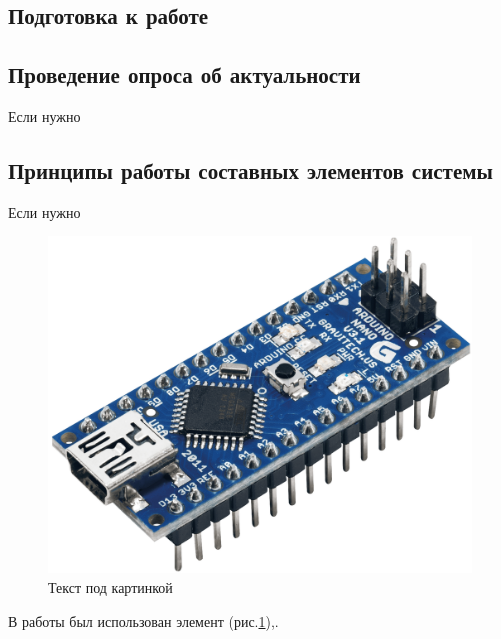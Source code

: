 	\newpage
		\begin{center}	
		\section{Подготовка к работе}
			\end{center}
		\subsection{Проведение опроса об актуальности }
	Если нужно
		
		\subsection{Принципы работы составных элементов системы}
	Если нужно
	
	\begin{figure}[H] 
		\center 
		\includegraphics[width=0.7\linewidth]{img/principle.png} %
		\caption{Текст под картинкой} 
		\label{image:principle}   %
	\end{figure}
	 В работы был использован элемент (рис.\ref{image:principle}),.
	
		